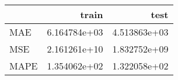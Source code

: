 \begin{tabular}{lrr}
\toprule
{} &         train &          test \\
\midrule
MAE  &  6.164784e+03 &  4.513863e+03 \\
MSE  &  2.161261e+10 &  1.832752e+09 \\
MAPE &  1.354062e+02 &  1.322058e+02 \\
\bottomrule
\end{tabular}
